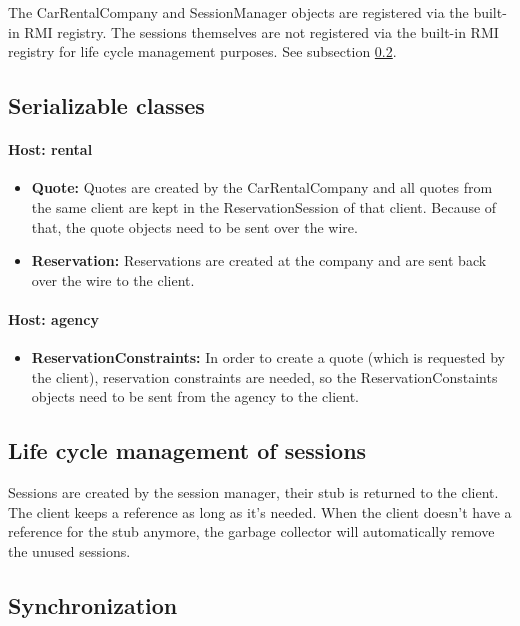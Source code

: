 \documentclass[10pt,a4paper]{article}
\begin{document}
The CarRentalCompany and SessionManager objects are registered via the built-in RMI registry. The sessions themselves are not registered via the built-in RMI registry for life cycle management purposes. See subsection \ref{lifecycle}.

\subsection{Serializable classes}

\paragraph{Host: rental}
\begin{itemize}
\item \textbf{Quote:} Quotes are created by the CarRentalCompany and all quotes from the same client are kept in the ReservationSession of that client. Because of that, the quote objects need to be sent over the wire.
\item \textbf{Reservation:} Reservations are created at the company and are sent back over the wire to the client. 
\end{itemize}

\paragraph{Host: agency}
\begin{itemize}
\item \textbf{ReservationConstraints:} In order to create a quote (which is requested by the client), reservation constraints are needed, so the ReservationConstaints objects need to be sent from the agency to the client. %
\end{itemize}

\subsection{Life cycle management of sessions}
\label{lifecycle}
Sessions are created by the session manager, their stub is returned to the client. The client keeps a reference as long as it's needed. When the client doesn't have a reference for the stub anymore, the garbage collector will automatically remove the unused sessions.

\subsection{Synchronization}
\end{document}
